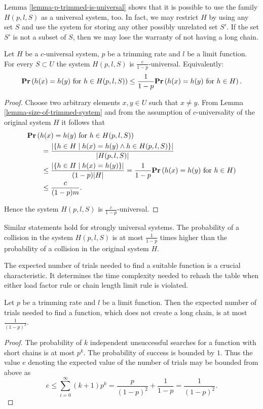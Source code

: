 Lemma \ref{lemma-p-trimmed-is-universal} shows that it is possible to use the family $H(p, l, S)$ as a universal system, too. In fact, we may restrict $H$ by using any set $S$ and use the system for storing any other possibly unrelated set $S'$. If the set $S'$ is not a subset of $S$, then we may lose the warranty of not having a long chain.
\begin{lemma}
\label{lemma-p-trimmed-is-universal}
Let $H$ be a $c$-universal system, $p$ be a trimming rate and $l$ be a limit function. For every $S \subset U$ the system $H(p, l, S)$ is $\frac{c}{1 - p}$-universal. Equivalently:
\[
	\mathbf{Pr}\left(h(x) = h(y) \text{ for } h \in H(p, l, S)\right) \leq \frac{1}{1 - p} \mathbf{Pr}\left(h(x) = h(y) \text{ for } h \in H\right) \text{.}
\]
\begin{proof}
Choose two arbitrary elements $x, y \in U$ such that $x \neq y$. From Lemma \ref{lemma-size-of-trimmed-system} and from the assumption of $c$-universality of the original system $H$ it follows that 
\[
\begin{split}
& \mathbf{Pr}\left(h(x) = h(y) \text{ for } h \in H(p, l, S)\right)  \\
	& \qquad =  \frac{|\{ h \in H \mid h(x) = h(y) \wedge h \in H(p, l, S)\}|}{|H(p, l, S)|} \\
	& \qquad \leq \frac{|\{ h \in H \mid h(x) = h(y) \}|}{(1 - p)|H|} = \frac{1}{1 - p} \mathbf{Pr}\left(h(x) = h(y) \text{ for } h \in H\right) \\
	& \qquad \leq \frac{c}{(1 - p) m} \text{.}
\end{split}
\]

Hence the system $H(p, l, S)$ is $\frac{c}{1 - p}$-universal.
\end{proof}
\end{lemma}

Similar statements hold for strongly universal systems. The probability of a collision in the system $H(p, l, S)$ is at most $\frac{1}{1 - p}$ times higher than the probability of a collision in the original system $H$.

The expected number of trials needed to find a suitable function is a crucial characteristic. It determines the time complexity needed to rehash the table when either load factor rule or chain length limit rule is violated. 

\begin{lemma}
\label{lemma-linear-transformations-trials}
Let $p$ be a trimming rate and $l$ be a limit function. Then the expected number of trials needed to find a function, which does not create a long chain, is at most $\frac{1}{(1 - p) ^ 2}$.
\end{lemma}
\begin{proof}
The probability of $k$ independent unsuccessful searches for a function with short chains is at most $p ^ k$. The probability of success is bounded by $1$. Thus the value $e$ denoting the expected value of the number of trials may be bounded from above as
\[
e \leq \sum_{i = 0}^{\infty} (k + 1)p^k = \frac{p}{(1 - p) ^ 2} + \frac{1}{1 - p} = \frac{1}{(1 - p) ^ 2} \text{.}
\]
\end{proof}


